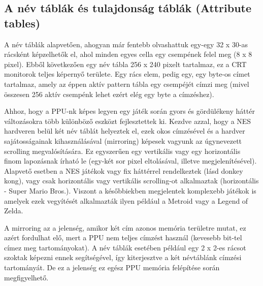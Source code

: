	\subsection{A név táblák és tulajdonság táblák (Attribute tables)}
	
	A név táblák alapvetően, ahogyan már fentebb olvashattuk egy-egy 32 x 30-as rácsként képzelhetők el, ahol minden egyes cella egy csempének felel meg (8 x 8 pixel). Ebből következően egy név tábla 256 x 240 pixelt tartalmaz, ez a CRT monitorok teljes képernyő területe. Egy rács elem, pedig egy, egy byte-os címet tartalmaz, amely az éppen aktív pattern tábla egy csempéjét címzi meg (mivel összesen 256 aktív csempénk lehet ezért elég egy byte a címzéshez).
	
	Ahhoz, hogy a PPU-nk képes legyen egy játék során gyors és gördülékeny háttér változásokra több különböző eszközt fejlesztettek ki. Kezdve azzal, hogy a NES hardveren belül két név táblát helyeztek el, ezek okos címzésével és a hardver sajátosságainak kihasználásával (mirroring) képesek vagyunk az úgynevezett scrolling megvalósítására. Ez egyszerűen egy vertikális vagy egy horizontális finom lapozásnak írható le (egy-két sor pixel eltolásával, illetve megjelenítésével). Alapvető esetben a NES játékok vagy fix háttérrel rendelkeztek (lásd donkey kong), vagy csak horizontális vagy vertikális scrolling-ot alkalmaztak (horizontális - Super Mario Bros.). Viszont a későbbiekben megjelentek komplexebb játékok is amelyek ezek vegyítését alkalmazták ilyen például a Metroid vagy a Legend of Zelda.
	
	A mirroring az a jelenség, amikor két cím azonos memória területre mutat, ez azért fordulhat elő, mert a PPU nem teljes címzést használ (kevesebb bit-tel címez meg tartományokat). A név táblák esetében például egy 2 x 2-es rácsot szoktak képezni ennek segítségével, így kiterjesztve a két névtáblánk címzési tartományát. De ez a jelenség ez egész PPU memória felépítése során megfigyelhető.
	
